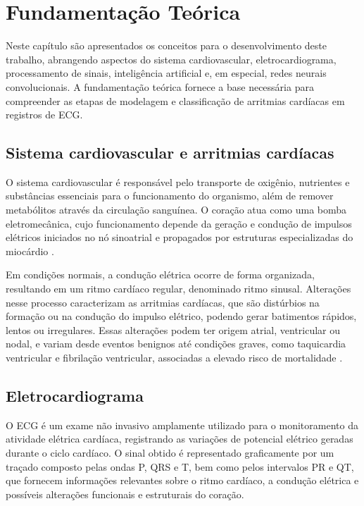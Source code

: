 \chapter[Fundamentação Teórica]{Fundamentação Teórica}

Neste capítulo são apresentados os conceitos para o desenvolvimento deste trabalho, abrangendo aspectos do sistema cardiovascular, 
eletrocardiograma, processamento de sinais, inteligência artificial e, em especial, redes neurais convolucionais. A fundamentação 
teórica fornece a base necessária para compreender as etapas de modelagem e classificação de arritmias cardíacas em registros de ECG.

\section{Sistema cardiovascular e arritmias cardíacas}

O sistema cardiovascular é responsável pelo transporte de oxigênio, nutrientes e substâncias essenciais para o funcionamento do organismo, além de 
remover metabólitos através da circulação sanguínea. O coração atua como uma bomba eletromecânica, cujo funcionamento depende da geração e condução 
de impulsos elétricos iniciados no nó sinoatrial e propagados por estruturas especializadas do miocárdio .

Em condições normais, a condução elétrica ocorre de forma organizada, resultando em um ritmo cardíaco regular, denominado ritmo sinusal. Alterações 
nesse processo caracterizam as arritmias cardíacas, que são distúrbios na formação ou na condução do impulso elétrico, podendo gerar batimentos rápidos, 
lentos ou irregulares. Essas alterações podem ter origem atrial, ventricular ou nodal, e variam desde eventos benignos até condições graves, como 
taquicardia ventricular e fibrilação ventricular, associadas a elevado risco de mortalidade .

\section{Eletrocardiograma}

O ECG é um exame não invasivo amplamente utilizado para o monitoramento da atividade elétrica cardíaca, registrando as variações de potencial elétrico 
geradas durante o ciclo cardíaco. O sinal obtido é representado graficamente por um traçado composto pelas ondas P, QRS e T, bem como pelos intervalos 
PR e QT, que fornecem informações relevantes sobre o ritmo cardíaco, a condução elétrica e possíveis alterações funcionais e estruturais do coração.

